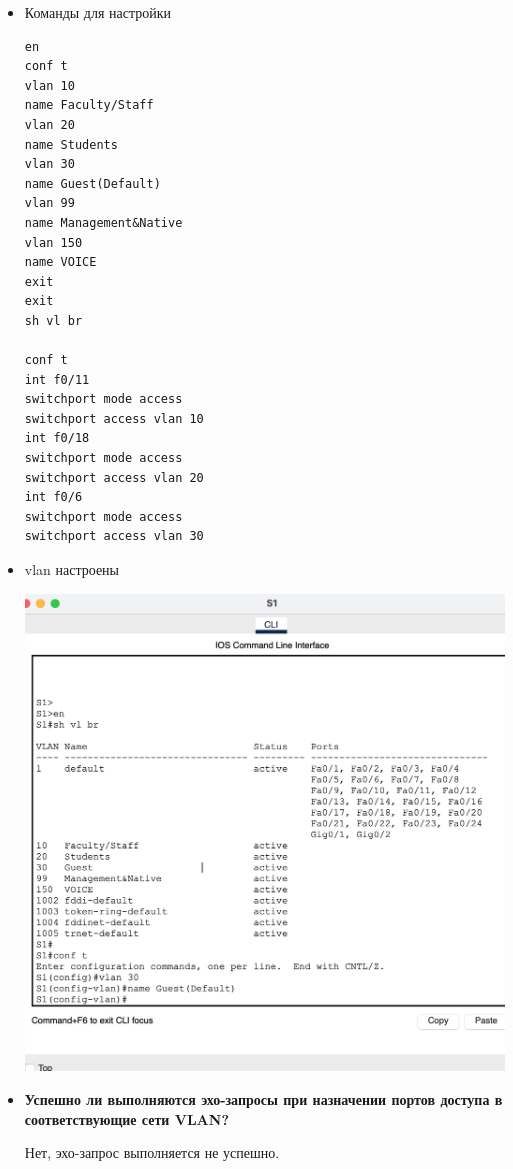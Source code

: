 \documentclass[a4paper,14pt]{extarticle}
\begin{document}
\begin{enumerate}
\begin{itemize}
            \item Команды для настройки
                \begin{lstlisting}
en
conf t
vlan 10 
name Faculty/Staff
vlan 20 
name Students
vlan 30 
name Guest(Default)
vlan 99 
name Management&Native
vlan 150 
name VOICE
exit
exit
sh vl br
                    
conf t
int f0/11
switchport mode access
switchport access vlan 10
int f0/18
switchport mode access
switchport access vlan 20
int f0/6
switchport mode access
switchport access vlan 30
                \end{lstlisting}
            \item vlan настроены
                \begin{center}
                    \includegraphics[scale=0.45]{pics/3.3.12_3.png}
                \end{center}
            \item \textbf{Успешно ли выполняются эхо-запросы при назначении портов доступа в соответствующие сети VLAN?}\par
                Нет, эхо-запрос выполняется не успешно. 
                \begin{center}

\end{center}
\end{itemize}
\end{enumerate}
\end{document}
